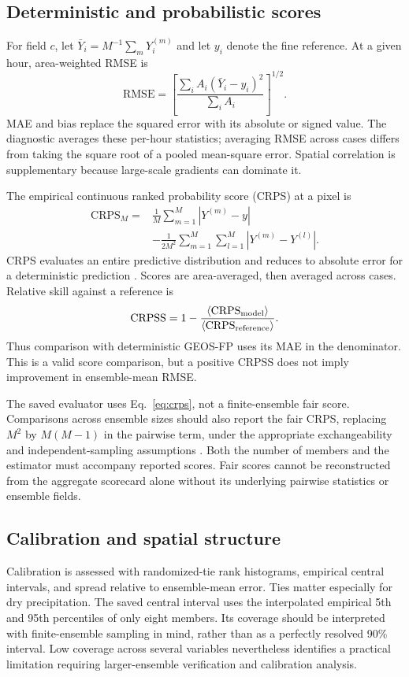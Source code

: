 \documentclass[10pt]{article}
\begin{document}
\subsection{Deterministic and probabilistic scores}
For field $c$, let $\bar Y_i=M^{-1}\sum_m Y_i^{(m)}$ and let $y_i$ denote the fine reference. At a given hour, area-weighted RMSE is
\begin{equation}
\mathrm{RMSE}=\left[\frac{\sum_i A_i(\bar Y_i-y_i)^2}{\sum_i A_i}\right]^{1/2}.
\end{equation}
MAE and bias replace the squared error with its absolute or signed value. The diagnostic averages these per-hour statistics; averaging RMSE across cases differs from taking the square root of a pooled mean-square error. Spatial correlation is supplementary because large-scale gradients can dominate it.

The empirical continuous ranked probability score (CRPS) at a pixel is
\begin{align}
\mathrm{CRPS}_M={}&\frac1M\sum_{m=1}^M|Y^{(m)}-y|\nonumber\\
&-\frac{1}{2M^2}\sum_{m=1}^M\sum_{l=1}^M|Y^{(m)}-Y^{(l)}|.
\label{eq:crps}
\end{align}
CRPS evaluates an entire predictive distribution and reduces to absolute error for a deterministic prediction \citep{gneiting2007}. Scores are area-averaged, then averaged across cases. Relative skill against a reference is
\begin{equation}
\mathrm{CRPSS}=1-\frac{\langle\mathrm{CRPS}_{\rm model}\rangle}
{\langle\mathrm{CRPS}_{\rm reference}\rangle}.
\end{equation}
Thus comparison with deterministic GEOS-FP uses its MAE in the denominator. This is a valid score comparison, but a positive CRPSS does not imply improvement in ensemble-mean RMSE.

The saved evaluator uses Eq.~\eqref{eq:crps}, not a finite-ensemble fair score. Comparisons across ensemble sizes should also report the fair CRPS, replacing $M^2$ by $M(M-1)$ in the pairwise term, under the appropriate exchangeability and independent-sampling assumptions \citep{ferro2014}. Both the number of members and the estimator must accompany reported scores. Fair scores cannot be reconstructed from the aggregate scorecard alone without its underlying pairwise statistics or ensemble fields.

\subsection{Calibration and spatial structure}
Calibration is assessed with randomized-tie rank histograms, empirical central intervals, and spread relative to ensemble-mean error. Ties matter especially for dry precipitation. The saved central interval uses the interpolated empirical 5th and 95th percentiles of only eight members. Its coverage should be interpreted with finite-ensemble sampling in mind, rather than as a perfectly resolved 90\% interval. Low coverage across several variables nevertheless identifies a practical limitation requiring larger-ensemble verification and calibration analysis.
\end{document}
